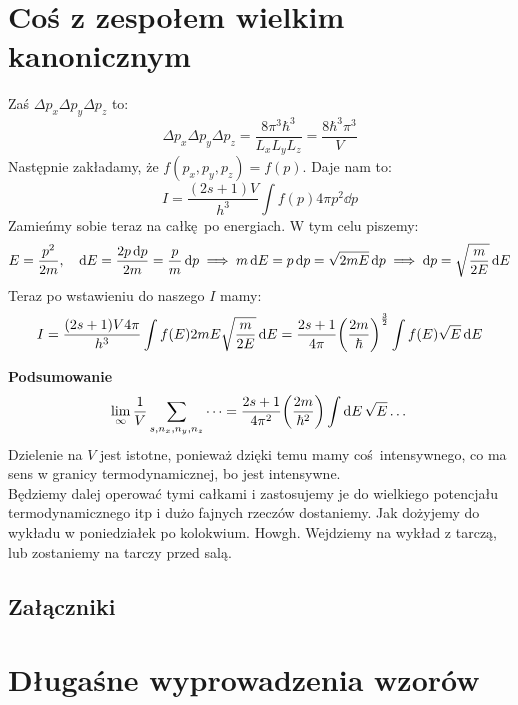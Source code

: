 \documentclass[12pt,a4paper]{report}
\renewcommand{\emph}{\textbf}
\newenvironment{lecture}[1]{\par\medskip
   \noindent\chapter{#1} \rmfamily}{\medskip}
\begin{document}
\begin{lecture}{Coś z zespołem wielkim kanonicznym}
\[    \]
    Zaś $\Delta p_x \Delta p_y \Delta p_z$ to:
    \[
        \Delta p_x \Delta p_y \Delta p_z = \frac{8 \pi^3 \hbar^3}{L_x L_y L_z} = \frac{8 \hbar^3 \pi^3}{V}
    \]
    Następnie zakładamy, że $f(p_x, p_y, p_z) = f(p)$. Daje nam to:
    \[
        I = \frac{(2s+1) V}{h^3} \int f(p) 4 \pi p^2 \dd{p}    
    \]
    Zamieńmy sobie teraz na całkę po energiach. W tym celu piszemy:
    \[
        E = \frac{p^2}{2m} \qc \dd{E} = \frac{2 p \dd{p}}{2m} = \frac{p}{m} \dd{p} \implies m \dd{E} = p \dd{p} = \sqrt{2 m E} \dd{p} \implies \dd{p} = \sqrt{\frac{m}{2 E}} \dd{E}    
    \]
    Teraz po wstawieniu do naszego $I$ mamy:
    \[
        I = \frac{(2s+1) V 4\pi}{h^3} \int f(E) 2 m E \sqrt{\frac{m}{2E}} \dd{E} = \frac{2s+1}{4\pi} \qty(\frac{2m}{\hbar})^{\frac32} \int f(E) \sqrt{E} \dd{E}   
    \]

    \emph{Podsumowanie}\\
    \[
        \lim_{\infty} \frac{1}{V} \sum_{s, n_x, n_y, n_z} \dots = \frac{2s+1}{4 \pi^2} \qty(\frac{2m}{\hbar^2}) \int \dd{E} \sqrt{E} \dots   
    \]
    Dzielenie na $V$ jest istotne, ponieważ dzięki temu mamy coś intensywnego, co ma sens w granicy termodynamicznej, bo jest intensywne.\\
    Będziemy dalej operować tymi całkami i zastosujemy je do wielkiego potencjału termodynamicznego itp i dużo fajnych rzeczów dostaniemy. Jak dożyjemy do wykładu w poniedziałek po kolokwium. Howgh. Wejdziemy na wykład z tarczą, lub zostaniemy na tarczy przed salą.
\end{lecture}
\tableofcontents

\listoffigures

\printindex


\begin{center}
    \chapter*{Załączniki}
\end{center}

\appendix
\setcounter{table}{0}
\captionsetup[table]{name=Załącznik}
\captionsetup[figure]{name=Załącznik}
\captionsetup[section]{name=Lecture}

\chapter{Długaśne wyprowadzenia wzorów}
\end{document}

